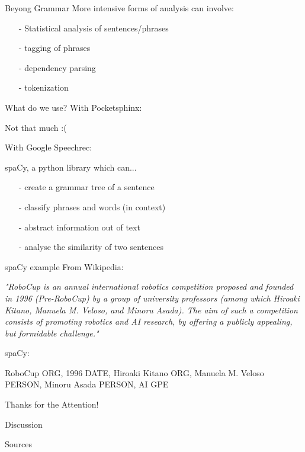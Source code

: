 \documentclass{beamer}
\begin{document}
	\begin{frame}{Beyong Grammar}
		More intensive forms of analysis can involve:
		\begin{itemize}
			\item[-] Statistical analysis of sentences/phrases
			\item[-] tagging of phrases
			\item[-] dependency parsing
			\item[-] tokenization
		\end{itemize} 
	\end{frame}
	
	\begin{frame}{What do we use?}
		With Pocketsphinx: 
		
		\pause
		Not that much :(
		
		With Google Speechrec:
		
		\pause
		spaCy, a python library which can...
		\begin{itemize}
			\item[-] create a grammar tree of a sentence
			\item[-] classify phrases and words (in context)
			\item[-] abstract information out of text
			\item[-] analyse the similarity of two sentences
		\end{itemize}
	\end{frame}
	
	\begin{frame}{spaCy example}
		From Wikipedia:
		
		\emph{"RoboCup is an annual international robotics competition proposed and founded in 1996 (Pre-RoboCup) by a group of university professors (among which Hiroaki Kitano, Manuela M. Veloso, and Minoru Asada). The aim of such a competition consists of promoting robotics and AI research, by offering a publicly appealing, but formidable challenge."}
		\pause
		
		spaCy:
		
		RoboCup ORG,
		1996 DATE,
		Hiroaki Kitano ORG,
		Manuela M. Veloso PERSON,
		Minoru Asada PERSON,
		AI GPE
	\end{frame}
	
	\begin{frame}{}
		Thanks for the Attention!
	\end{frame}
	
	\begin{frame}{}
		Discussion
	\end{frame}
	
	
	\begin{frame}{Sources}
		
		
	\end{frame}
	
\end{document}
